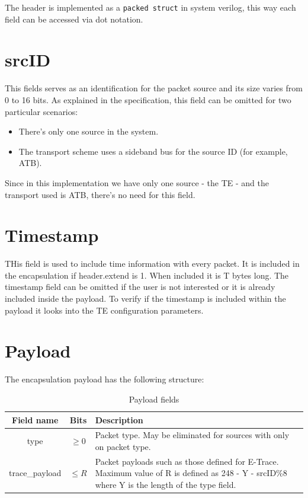 The header is implemented as a \texttt{packed struct} in system verilog, this way each field can be 
accessed via dot notation.

\section{srcID}
This fields serves as an identification for the packet source and its size varies from 0 to 16 
bits.
As explained in the specification, this field can be omitted for two particular scenarios:
\begin{itemize}
    \item   There's only one source in the system.
    \item   The transport scheme uses a sideband bus for the source ID (for example, ATB). 
\end{itemize}

Since in this implementation we have only one source - the TE - and the transport used is ATB, 
there's no need for this field.

\section{Timestamp}
THis field is used to include time information with every packet. It is included in the 
encapsulation if header.extend is 1. When included it is T bytes long.
The timestamp field can be omitted if the user is not interested or it is already included inside 
the payload. To verify if the timestamp is included within the payload it looks into the TE 
configuration parameters.

\section{Payload}
The encapsulation payload has the following structure:
\begin{table}[H]
    \centering 
    \begin{tabularx}{\textwidth}{|c|c|>{\centering\arraybackslash}X|} 
        \hline
        Field name      & Bits      & Description \\ \hline
        type            & $\geq 0$  & Packet type. May be eliminated for sources with only on 
                                      packet type. \\ \hline
        trace\_payload  & $\leq R$  & Packet payloads such as those defined for E-Trace. Maximum 
                                      value of R is defined as 248 - Y - srcID\%8 where Y is the 
                                      length of the type field. \\ \hline
    \end{tabularx}
    \caption{Payload fields} 
    \label{tab:payload}
\end{table}

